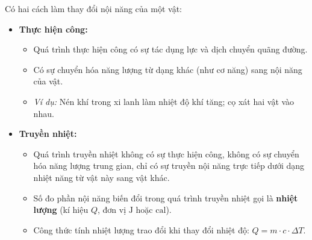 Có hai cách làm thay đổi nội năng của một vật:
\begin{itemize}
    \item \textbf{Thực hiện công:}
    \begin{itemize}
        \item Quá trình thực hiện công có sự tác dụng lực và dịch chuyển quãng đường.
        \item Có sự chuyển hóa năng lượng từ dạng khác (như cơ năng) sang nội năng của vật.
        \item \textit{Ví dụ:} Nén khí trong xi lanh làm nhiệt độ khí tăng; cọ xát hai vật vào nhau.
    \end{itemize}
    \item \textbf{Truyền nhiệt:}
    \begin{itemize}
        \item Quá trình truyền nhiệt không có sự thực hiện công, không có sự chuyển hóa năng lượng trung gian, chỉ có sự truyền nội năng trực tiếp dưới dạng nhiệt năng từ vật này sang vật khác.
        \item Số đo phần nội năng biến đổi trong quá trình truyền nhiệt gọi là \textbf{nhiệt lượng} (kí hiệu $Q$, đơn vị $\mathrm{J}$ hoặc $\mathrm{cal}$).
        \item Công thức tính nhiệt lượng trao đổi khi thay đổi nhiệt độ: $Q = m \cdot c \cdot \Delta T$.
    \end{itemize}
\end{itemize}

